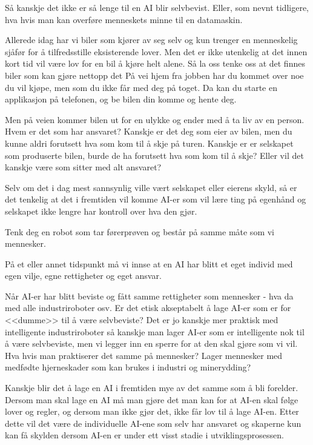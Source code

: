 Så kanskje det ikke er så lenge til en AI blir selvbevist. Eller, som nevnt tidligere, hva hvis man kan overføre menneskets minne til en datamaskin.

Allerede idag har vi biler som kjører av seg selv og kun trenger en
menneskelig sjåfør for å tilfredsstille eksisterende lover. Men det er ikke
utenkelig at det innen kort tid vil være lov for en bil å kjøre helt alene. Så la oss tenke oss at det finnes biler som kan gjøre nettopp det På vei hjem fra
jobben har du kommet over noe du vil kjøpe, men som du ikke får med deg på
toget. Da kan du starte en applikasjon på telefonen, og be bilen din komme og hente deg.

Men på veien kommer bilen ut for en ulykke og ender med å ta liv av en person.
Hvem er det som har ansvaret? Kanskje er det deg som eier av bilen, men du
kunne aldri forutsett hva som kom til å skje på turen. Kanskje er er
selskapet som produserte bilen, burde de ha forutsett hva som kom til å skje? Eller vil det kanskje være som sitter med alt ansvaret?

Selv om det i dag mest sannsynlig ville vært selskapet eller eierens skyld, så er det tenkelig at det i fremtiden vil komme AI-er som vil lære ting på egenhånd
og selskapet ikke lengre har kontroll over hva den gjør.

Tenk deg en robot som tar førerprøven og består på samme måte som vi mennesker.

På et eller annet tidspunkt må vi innse at en AI har blitt et eget individ med
egen vilje, egne rettigheter og eget ansvar. 


Når AI-er har blitt beviste og fått samme rettigheter som mennesker - hva da
med alle industriroboter osv. Er det etisk akseptabelt å lage AI-er som er for
<<dumme>> til å være selvbeviste?
Det er jo kanskje mer praktisk med intelligente industriroboter så kanskje man
lager AI-er som er intelligente nok til å være selvbeviste, men vi legger inn en
sperre for at den skal gjøre som vi vil. Hva hvis man praktiserer det samme på
mennesker? Lager mennesker med medfødte hjerneskader som kan brukes i industri
og minerydding?


Kanskje blir det å lage en AI i fremtiden mye av det samme som å bli forelder.
Dersom man skal lage en AI må man gjøre det man kan for at AI-en skal følge
lover og regler, og dersom man ikke gjør det, ikke får lov til å lage AI-en.
Etter dette vil det være de individuelle AI-ene som selv har ansvaret og
skaperne kun kan få skylden dersom AI-en er under ett visst stadie i utviklingsprosessen.
